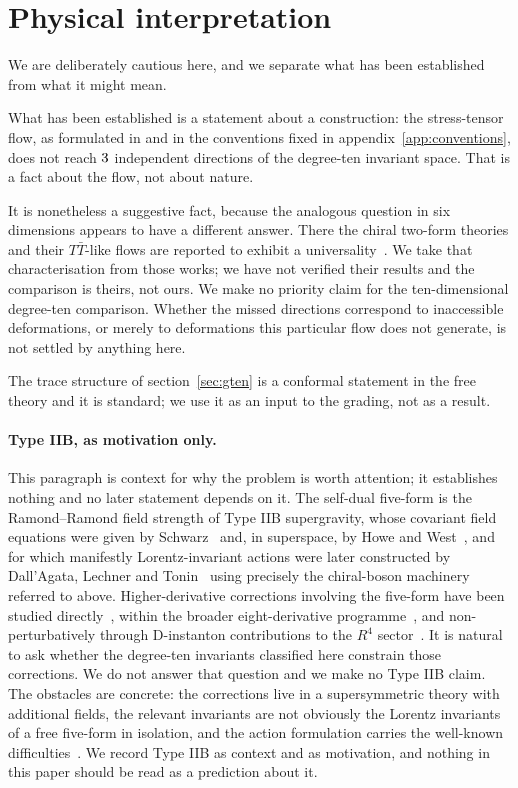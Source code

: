 \documentclass[11pt,a4paper]{article}
\theoremstyle{definition}
\theoremstyle{remark}
\begin{document}
\section{Physical interpretation}
\label{sec:physics}

We are deliberately cautious here, and we separate what has been established from
what it might mean.

What has been established is a statement about a construction: the stress-tensor
flow, as formulated in \cite{Hutomo:2025chiral} and in the conventions fixed in
appendix~\ref{app:conventions}, does not reach $3$ independent directions
of the degree-ten invariant space. That is a fact about the flow, not about
nature.

It is nonetheless a suggestive fact, because the analogous question in six
dimensions appears to have a different answer. There the chiral two-form theories
and their $T\bar T$-like flows are reported to exhibit a
universality~\cite{Ferko:2024chiral,Brizio:2026ttbar}. We take that
characterisation from those works; we have not verified their results and the
comparison is theirs, not ours. We make no priority claim for the
ten-dimensional degree-ten comparison. Whether the missed directions correspond to inaccessible
deformations, or merely to deformations this particular flow does not generate,
is not settled by anything here.

The trace structure of section~\ref{sec:gten} is a conformal statement in the
free theory and it is standard; we use it as an input to the grading, not as a
result.

\paragraph{Type IIB, as motivation only.}
This paragraph is context for why the problem is worth attention; it establishes
nothing and no later statement depends on it. The self-dual five-form is the
Ramond--Ramond field strength of Type IIB supergravity, whose covariant field
equations were given by Schwarz~\cite{Schwarz:1983qr} and, in superspace, by
Howe and West~\cite{Howe:1983sra}, and for which manifestly Lorentz-invariant
actions were later constructed by Dall'Agata, Lechner and
Tonin~\cite{DallAgata:1998ahf} using precisely the chiral-boson machinery
referred to above. Higher-derivative corrections involving the five-form have
been studied directly~\cite{Paulos:2008tn}, within the broader eight-derivative
programme~\cite{Green:1997as,Liu:2022bfg}, and non-perturbatively through
D-instanton contributions to the $R^4$ sector~\cite{Green:1997tv,Green:1997di}. It is natural to ask whether the
degree-ten invariants classified here constrain those corrections. We do not
answer that question and we make no Type IIB claim. The obstacles are concrete:
the corrections live in a supersymmetric theory with additional fields, the
relevant invariants are not obviously the Lorentz invariants of a free five-form
in isolation, and the action formulation carries the well-known
difficulties~\cite{Marcus:1982yu,Sen:2019qit}. We record Type IIB as context and
as motivation, and nothing in this paper should be read as a prediction about it.
\end{document}
